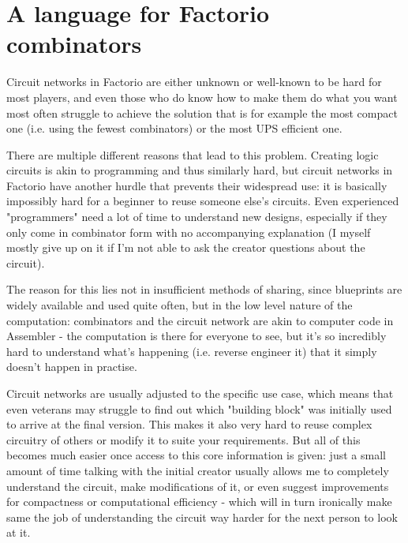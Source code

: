 \documentclass[landscape]{article}
\theoremstyle{plain}
\theoremstyle{definition}
\begin{document}
\section{A language for Factorio combinators}
Circuit networks in Factorio are either unknown or well-known to be hard for most players, and even those who do know how to make them do what you want most often struggle to achieve the solution that is for example the most compact one (i.e. using the fewest combinators) or the most UPS efficient one.

There are multiple different reasons that lead to this problem. Creating logic circuits is akin to programming and thus similarly hard, but circuit networks in Factorio have another hurdle that prevents their widespread use: it is basically impossibly hard for a beginner to reuse someone else's circuits. Even experienced "programmers" need a lot of time to understand new designs, especially if they only come in combinator form with no accompanying explanation (I myself mostly give up on it if I'm not able to ask the creator questions about the circuit).

The reason for this lies not in insufficient methods of sharing, since blueprints are widely available and used quite often, but in the low level nature of the computation: combinators and the circuit network are akin to computer code in Assembler - the computation is there for everyone to see, but it's so incredibly hard to understand what's happening (i.e. reverse engineer it) that it simply doesn't happen in practise.

Circuit networks are usually adjusted to the specific use case, which means that even veterans may struggle to find out which "building block" was initially used to arrive at the final version. This makes it also very hard to reuse complex circuitry of others or modify it to suite your requirements. But all of this becomes much easier once access to this core information is given: just a small amount of time talking with the initial creator usually allows me to completely understand the circuit, make modifications of it, or even suggest improvements for compactness or computational efficiency - which will in turn ironically make same the job of understanding the circuit way harder for the next person to look at it.
\end{document}
